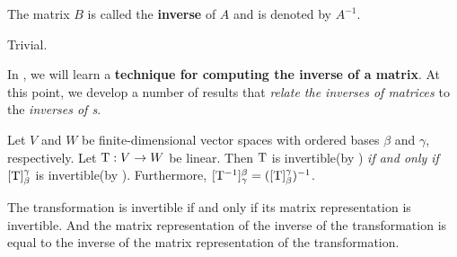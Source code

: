  The matrix \(B\) is called the \textbf{inverse} of \(A\) and is denoted by \(A^{-1}\).

\begin{example} \label{example 2.4.2}
Trivial.
\end{example}

In , we will learn a \textbf{technique for computing the inverse of a matrix}.
At this point, we develop a number of results that \emph{relate the inverses of matrices} to the \emph{inverses of \LTRAN{}s}.

\begin{theorem} \label{thm 2.18}
Let \(V\) and \(W\) be finite-dimensional vector spaces with ordered bases \(\beta\) and \(\gamma\), respectively.
Let \(\mathrm{T} : V \to W\) be linear.
Then \(\mathrm{T}\) is invertible(by ) \emph{if and only if} \([\mathrm{T}]_{\beta}^{\gamma}\) is invertible(by ).
Furthermore, \([\mathrm{T}^{-1}]_{\gamma}^{\beta} = ([\mathrm{T}]_{\beta}^{\gamma})^{-1}\).
\end{theorem}

\begin{note}
The transformation is invertible if and only if its matrix representation is invertible.
And the matrix representation of the inverse of the transformation is equal to the inverse of the matrix representation of the transformation.
\end{note}

